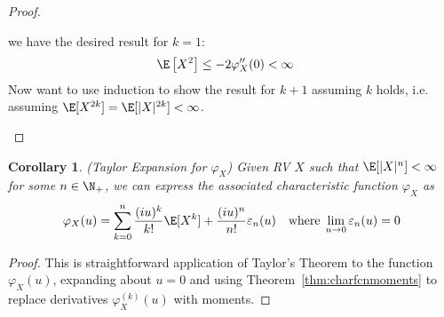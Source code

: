 \documentclass[12pt]{article}
\theoremstyle{plain}
\newtheorem{cor}[thm]{Corollary}
\theoremstyle{definition}
\theoremstyle{remark}
\newcommand{\ra}{\rightarrow}
\newcommand{\one}[1]{\mathbf{1}_{#1}}
\begin{document}
\begin{proof}
\begin{enumerate}[label=(\roman*)]
    we have the desired result for $k=1$:
    \begin{align*}
      \E\left[
      X^2
      \right]
      &\leq
      -2\varphi_X''(0) < \infty
    \end{align*}
    Now want to use induction to show the result for $k+1$ assuming $k$
    holds, i.e. assuming $\E[X^{2k}]=\E[|X|^{2k}]<\infty$.
\end{enumerate}
\end{proof}

\begin{cor}\emph{(Taylor Expansion for $\varphi_X$)}
\label{cor:chartaylor}
Given RV $X$ such that $\E[|X|^n]<\infty$ for some $n\in\N_+$,
we can express the associated characteristic function $\varphi_X$ as
\begin{align*}
  \varphi_X(u)
  = \sum_{k=0}^n
  \frac{(iu)^k}{k!}
  \E[X^k]
  + \frac{(iu)^n}{n!}\varepsilon_n(u)
  \quad\text{where}\;
  \lim_{u\ra 0}\varepsilon_n(u)=0
\end{align*}
\end{cor}
\begin{proof}
This is straightforward application of Taylor's Theorem to the function
$\varphi_X(u)$, expanding about $u=0$ and using
Theorem~\ref{thm:charfcnmoments} to replace derivatives
$\varphi_X^{(k)}(u)$ with moments.
\end{proof}
\end{document}
